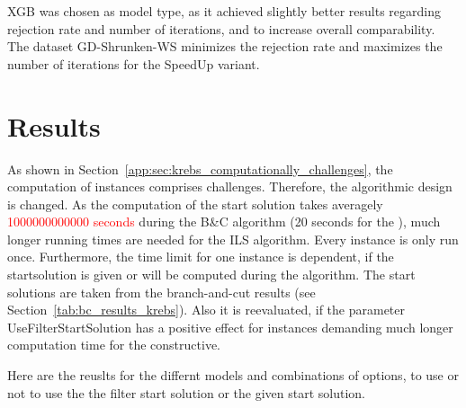\gls{XGB} was chosen as model type, as it achieved slightly better results
regarding rejection rate and number of iterations, and to increase overall comparability.
The dataset GD-Shrunken-WS minimizes the rejection rate and maximizes the number of iterations for the SpeedUp variant.

\section{Results}
\label{sec:results_krebs}
As shown in Section~\ref{app:sec:krebs_computationally_challenges}, the computation of \krebsADataSetText instances comprises
challenges. Therefore, the algorithmic design is changed. As the computation of the start solution takes averagely \textcolor{red}{1000000000000 seconds}
during the B\&C algorithm (20 seconds for the \gendreauDataSetText), much longer running times are needed for the \gls{ILS} algorithm.
Every instance is only run once. Furthermore, the time limit for one instance
is dependent, if the startsolution is given or will be computed during the algorithm. The start solutions are taken from the branch-and-cut
results (see Section~\ref{tab:bc_results_krebs}). Also it is reevaluated, if the parameter UseFilterStartSolution has a positive effect
for instances demanding much longer computation time for the constructive.



\parbreak
Here are the reuslts for the differnt models and combinations of options, to use or not to use the the filter start solution or the given start solution.

